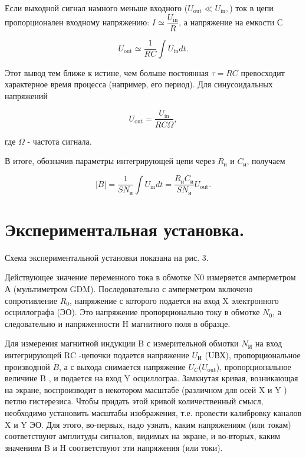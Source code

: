 \documentclass[12pt]{lab}
\begin{document}
Если выходной сигнал намного меньше входного ($U_\text{out}\ll U_\text{in},$)
ток в цепи пропорционален входному напряжению:
$I\simeq\dfrac{U_\text{in}}{R}$, а напряжение на емкости С

$$U_\text{out}\simeq\dfrac{1}{RC}\int U_\text{in}dt.$$

Этот вывод тем ближе к истине, чем больше постоянная $\tau=RC$
превосходит характерное время процесса (например, его период). Для
синусоидальных напряжений

$$U_\text{out}=\dfrac{U_\text{in}}{RC\Omega},$$

где $\Omega$ - частота сигнала.

В итоге, обозначив параметры интегрирующей цепи через $R_\text{и}$ и
$C_\text{и}$, получаем

$$ |B|=\dfrac{1}{SN_\text{и}}\int
U_\text{in}dt=\dfrac{R_\text{и}C_\text{и}}{SN_\text{и}}U_\text{out}.$$

\section{Экспериментальная установка.}
Схема экспериментальной установки показана на рис. 3.

Действующее значение переменного тока в обмотке N0 измеряется
амперметром А (мультиметром GDM). Последовательно с амперметром
включено сопротивление $R_{0}$, напряжение с которого подается на
вход X электронного осциллографа (ЭО). Это напряжение пропорционально
току в обмотке $N_{0}$, а следовательно и напряженности H магнитного
поля в образце.

Для измерения магнитной индукции B с измерительной обмотки $N_\text{И}$ на
вход интегрирующей RC -цепочки подается напряжение $U_\text{И}$ (UВХ),
пропорциональное производной $\dot{B}$, а с выхода снимается
напряжение $U_{C}$($U_\text{out}$), пропорциональное
величине B , и подается на вход Y осциллограа.
Замкнутая кривая, возникающая на экране, воспроизводит в некотором
масштабе (различном для осей X и Y ) петлю гистерезиса. Чтобы придать
этой кривой количественный смысл, необходимо установить масштабы
изображения, т.е. провести калибровку каналов X и Y ЭО. Для этого,
во-первых, надо узнать, каким напряжениям (или токам) соответствуют
амплитуды сигналов, видимых на экране, и во-вторых,  каким значениям
B и H соответствуют эти напряжения
(или токи).
\end{document}
